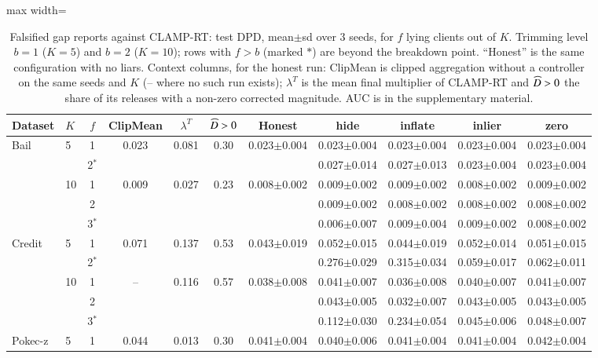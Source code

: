 \begin{table}[tbp]
\centering
\scriptsize
\setlength{\tabcolsep}{3pt}
\caption{Falsified gap reports against CLAMP-RT: test DPD, mean$\pm$sd over 3 seeds, for $f$ lying clients out of $K$. Trimming level $b=1$ ($K=5$) and $b=2$ ($K=10$); rows with $f>b$ (marked $\ast$) are beyond the breakdown point. ``Honest'' is the same configuration with no liars. Context columns, for the honest run: ClipMean is clipped aggregation without a controller on the same seeds and $K$ (-- where no such run exists); $\lambda^T$ is the mean final multiplier of CLAMP-RT and $\widehat{D}>0$ the share of its releases with a non-zero corrected magnitude. AUC is in the supplementary material.}
\label{tab:e4}
\begin{adjustbox}{max width=\textwidth}
\begin{tabular}{llccccccccc}
\toprule
Dataset & $K$ & $f$ & ClipMean & $\lambda^T$ & $\widehat{D}>0$ & Honest & hide & inflate & inlier & zero \\
\midrule
Bail & 5 & 1 & 0.023 & 0.081 & 0.30 & 0.023$\pm$0.004 & 0.023$\pm$0.004 & 0.023$\pm$0.004 & 0.023$\pm$0.004 & 0.023$\pm$0.004 \\
 &  & 2$^\ast$ &  & &  &  & 0.027$\pm$0.014 & 0.027$\pm$0.013 & 0.023$\pm$0.004 & 0.023$\pm$0.004 \\
 & 10 & 1 & 0.009 & 0.027 & 0.23 & 0.008$\pm$0.002 & 0.009$\pm$0.002 & 0.009$\pm$0.002 & 0.008$\pm$0.002 & 0.009$\pm$0.002 \\
 &  & 2 &  & &  &  & 0.009$\pm$0.002 & 0.008$\pm$0.002 & 0.008$\pm$0.002 & 0.008$\pm$0.002 \\
 &  & 3$^\ast$ &  & &  &  & 0.006$\pm$0.007 & 0.009$\pm$0.004 & 0.009$\pm$0.002 & 0.008$\pm$0.002 \\
\midrule
Credit & 5 & 1 & 0.071 & 0.137 & 0.53 & 0.043$\pm$0.019 & 0.052$\pm$0.015 & 0.044$\pm$0.019 & 0.052$\pm$0.014 & 0.051$\pm$0.015 \\
 &  & 2$^\ast$ &  & &  &  & 0.276$\pm$0.029 & 0.315$\pm$0.034 & 0.059$\pm$0.017 & 0.062$\pm$0.011 \\
 & 10 & 1 & -- & 0.116 & 0.57 & 0.038$\pm$0.008 & 0.041$\pm$0.007 & 0.036$\pm$0.008 & 0.040$\pm$0.007 & 0.041$\pm$0.007 \\
 &  & 2 &  & &  &  & 0.043$\pm$0.005 & 0.032$\pm$0.007 & 0.043$\pm$0.005 & 0.043$\pm$0.005 \\
 &  & 3$^\ast$ &  & &  &  & 0.112$\pm$0.030 & 0.234$\pm$0.054 & 0.045$\pm$0.006 & 0.048$\pm$0.007 \\
\midrule
Pokec-z & 5 & 1 & 0.044 & 0.013 & 0.30 & 0.041$\pm$0.004 & 0.040$\pm$0.006 & 0.041$\pm$0.004 & 0.041$\pm$0.004 & 0.042$\pm$0.004 \\

\end{tabular}
\end{adjustbox}
\end{table}
